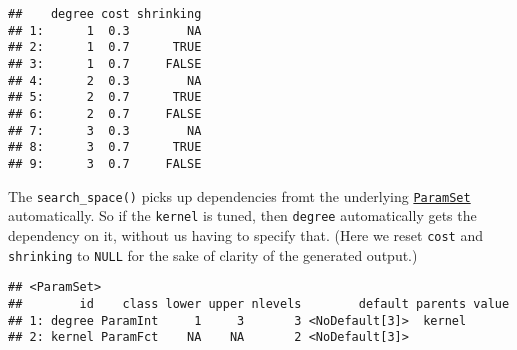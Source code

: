 \documentclass[
]{scrbook}
\newenvironment{Shaded}{\begin{snugshade}}{\end{snugshade}}
\newcommand{\AttributeTok}[1]{\textcolor[rgb]{0.77,0.63,0.00}{#1}}
\newcommand{\ConstantTok}[1]{\textcolor[rgb]{0.00,0.00,0.00}{#1}}
\newcommand{\DecValTok}[1]{\textcolor[rgb]{0.00,0.00,0.81}{#1}}
\newcommand{\FunctionTok}[1]{\textcolor[rgb]{0.00,0.00,0.00}{#1}}
\newcommand{\NormalTok}[1]{#1}
\newcommand{\OtherTok}[1]{\textcolor[rgb]{0.56,0.35,0.01}{#1}}
\newcommand{\SpecialCharTok}[1]{\textcolor[rgb]{0.00,0.00,0.00}{#1}}
\newcommand{\StringTok}[1]{\textcolor[rgb]{0.31,0.60,0.02}{#1}}
\renewenvironment{Shaded} {\begin{snugshade}\small} {\end{snugshade}}
\begin{document}
\begin{Shaded}
\end{Shaded}

\begin{verbatim}
##    degree cost shrinking
## 1:      1  0.3        NA
## 2:      1  0.7      TRUE
## 3:      1  0.7     FALSE
## 4:      2  0.3        NA
## 5:      2  0.7      TRUE
## 6:      2  0.7     FALSE
## 7:      3  0.3        NA
## 8:      3  0.7      TRUE
## 9:      3  0.7     FALSE
\end{verbatim}

The \texttt{search\_space()} picks up dependencies fromt the underlying \href{https://paradox.mlr-org.com/reference/ParamSet.html}{\texttt{ParamSet}} automatically.
So if the \texttt{kernel} is tuned, then \texttt{degree} automatically gets the dependency on it, without us having to specify that.
(Here we reset \texttt{cost} and \texttt{shrinking} to \texttt{NULL} for the sake of clarity of the generated output.)

\begin{Shaded}
\end{Shaded}

\begin{verbatim}
## <ParamSet>
##        id    class lower upper nlevels        default parents value
## 1: degree ParamInt     1     3       3 <NoDefault[3]>  kernel      
## 2: kernel ParamFct    NA    NA       2 <NoDefault[3]>
\end{verbatim}
\end{document}
